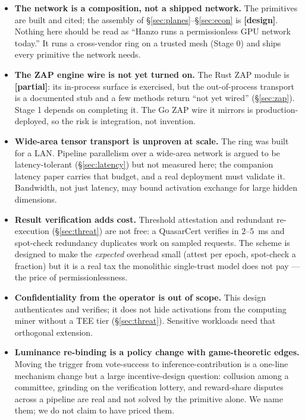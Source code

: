 \documentclass[11pt]{article}
\newcommand{\partialb}{\textcolor{kw}{\small\textbf{[partial]}}}
\newcommand{\design}{\textcolor{cmt}{\small\textbf{[design]}}}
\begin{document}
\begin{itemize}[leftmargin=1.4em,itemsep=2pt]
\item \textbf{The network is a composition, not a shipped network.} The primitives are built and
cited; the assembly of \S\ref{sec:planes}--\S\ref{sec:econ} is \design{}. Nothing here should be
read as ``Hanzo runs a permissionless GPU network today.'' It runs a cross-vendor ring on a
trusted mesh (Stage 0) and ships every primitive the network needs.

\item \textbf{The ZAP engine wire is not yet turned on.} The Rust ZAP module is \partialb{}: its
in-process surface is exercised, but the  out-of-process transport is a documented
stub and a few methods return ``not yet wired'' (\S\ref{sec:zap}). Stage 1 depends on completing
it. The Go ZAP wire it mirrors is production-deployed, so the risk is integration, not invention.

\item \textbf{Wide-area tensor transport is unproven at scale.} The ring was built for a LAN.
Pipeline parallelism over a wide-area network is argued to be latency-tolerant
(\S\ref{sec:latency}) but not measured here; the companion latency paper carries that budget, and
a real deployment must validate it. Bandwidth, not just latency, may bound activation exchange
for large hidden dimensions.

\item \textbf{Result verification adds cost.} Threshold attestation and redundant re-execution
(\S\ref{sec:threat}) are not free: a QuasarCert verifies in $2$--$5$~ms and spot-check redundancy
duplicates work on sampled requests. The scheme is designed to make the \emph{expected} overhead
small (attest per epoch, spot-check a fraction) but it is a real tax the monolithic single-trust
model does not pay --- the price of permissionlessness.

\item \textbf{Confidentiality from the operator is out of scope.} This design authenticates and
verifies; it does not hide activations from the computing miner without a TEE tier
(\S\ref{sec:threat}). Sensitive workloads need that orthogonal extension.

\item \textbf{Luminance re-binding is a policy change with game-theoretic edges.} Moving the
 trigger from vote-success to inference-contribution is a one-line mechanism
change but a large incentive-design question: collusion among a committee, grinding on the
verification lottery, and reward-share disputes across a pipeline are real and not solved by the
primitive alone. We name them; we do not claim to have priced them.
\end{itemize}
\end{document}
